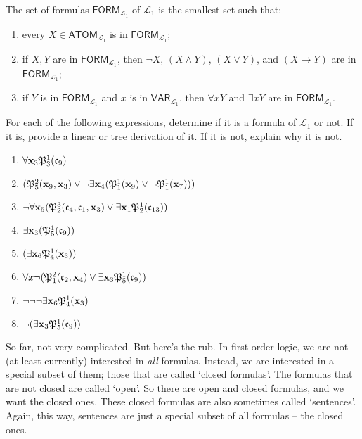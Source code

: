 \begin{defn}[Formulas]
The set of formulas $\textsf{FORM}_{\mathcal{L}_1}$ of $\mathcal{L}_1$ is the smallest set such that: 
%
\begin{enumerate}
	\item every $X \in \textsf{ATOM}_{\mathcal{L}_1}$ is in $\textsf{FORM}_{\mathcal{L}_1}$;
	\item if $X, Y$ are in  $\textsf{FORM}_{\mathcal{L}_1}$, then $\neg X$, $(X \wedge Y)$, $(X \vee Y)$, and $(X \rightarrow Y)$ are in $\textsf{FORM}_{\mathcal{L}_1}$;
	\item if $Y$ is in  $\textsf{FORM}_{\mathcal{L}_1}$ and $x$ is in $\mathsf{VAR}_{\mathcal{L}_1}$, then $\forall x Y$ and $\exists x Y$ are in  $\textsf{FORM}_{\mathcal{L}_1}$.  
\end{enumerate}
\end{defn}

\begin{exc}
	For each of the following expressions, determine if it is a formula of $\mathcal{L}_1$ or not. If it is, provide a linear or tree derivation of it. If it is not, explain why it is not. 
	
	\begin{enumerate}
	\item $\forall \mathbf{x}_{3} \mathfrak{P}^{1}_{3}(\mathfrak{c}_{9})$
	\item $(\mathfrak{P}^{2}_{5}(\mathbf{x}_{9}, \mathbf{x}_{3}) \vee \neg \exists \mathbf{x}_{4}(\mathfrak{P}^{1}_{1}(\mathbf{x}_{9}) \vee \neg \mathfrak{P}^{1}_{1}(\mathbf{x}_{7})))$
	\item $\neg \forall \mathbf{x}_{5} (\mathfrak{P}^{3}_{2}(\mathfrak{c}_{4}, \mathfrak{c}_{1}, \mathbf{x}_{3}) \vee \exists \mathbf{x}_{1} \mathfrak{P}^{1}_{2}(\mathfrak{c}_{13}))$
	\item $\exists \mathbf{x}_{3}(\mathfrak{P}^{1}_{5}(\mathfrak{c}_{9}))$
	\item $(\exists \mathbf{x}_{6} \mathfrak{P}^{1}_{4}(\mathbf{x}_{3}))$
	\item $\forall x \neg (\mathfrak{P}^{2}_{1}(\mathfrak{c}_{2}, \mathbf{x}_{4}) \vee \exists \mathbf{x}_{3}\mathfrak{P}^{1}_{5}(\mathfrak{c}_{9}))$
	\item $\neg\neg\neg\exists \mathbf{x}_{6} \mathfrak{P}^{1}_{4}(\mathbf{x}_{3})$
	\item $\neg(\exists \mathbf{x}_{3}\mathfrak{P}^{1}_{5}(\mathfrak{c}_{9}))$
	\end{enumerate}
\end{exc}

So far, not very complicated. But here's the rub. In first-order logic, we are not (at least currently) interested in \textit{all} formulas. Instead, we are interested in a special subset of them; those that are called `closed formulas'. The formulas that are not closed are called `open'. So there are open and closed formulas, and we want the closed ones. These closed formulas are also sometimes called `sentences'. Again, this way, sentences are just a special subset of all formulas -- the closed ones. 

